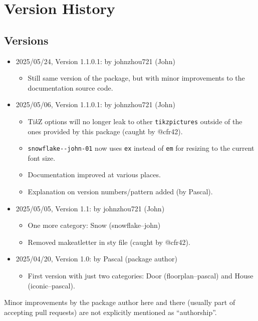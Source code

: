 \documentclass{article}
\begin{document}
\section*{Version History}

\subsection*{Versions}

\begin{itemize}[nosep,parsep=2pt]
  \item 2025/05/24, Version 1.1.0.1: \hfill by johnzhou721 (John)
  \begin{itemize}
      \item Still same version of the package, but with minor improvements to the documentation source code.
  \end{itemize}    
  \item 2025/05/06, Version 1.1.0.1: \hfill by johnzhou721 (John)
  \begin{itemize}
      \item Ti\emph{k}Z options will no longer leak to other \verb|tikzpictures| outside of the ones provided by this package (caught by @cfr42).
      \item \verb|snowflake--john-01| now uses \verb|ex| instead of \verb|em| for resizing to the current font size.
      \item Documentation improved at various places.
      \item Explanation on version numbers/pattern added (by Pascal).
  \end{itemize}
  \item 2025/05/05, Version 1.1: \hfill by johnzhou721 (John)
  \begin{itemize}
      \item One more category: Snow (snowflake--john)
      \item Removed makeatletter in sty file (caught by @cfr42).
  \end{itemize}
  \item 2025/04/20, Version 1.0: \hfill by Pascal (package author)
  \begin{itemize}
      \item First version with just two categories: Door (floorplan--pascal) and House (iconic--pascal).
  \end{itemize}
\end{itemize}

Minor improvements by the package author here and there (usually part of accepting pull requests) are not explicitly mentioned as ``authorship''.
\end{document}
